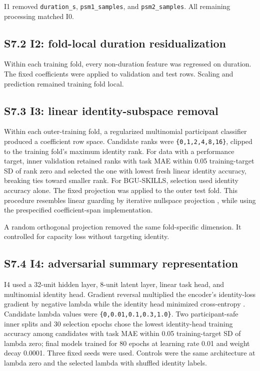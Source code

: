 \documentclass[11pt]{article}
\begin{document}
I1 removed \texttt{duration\_s}, \texttt{psm1\_samples}, and
\texttt{psm2\_samples}. All remaining processing matched I0.

\subsection{S7.2 I2: fold-local duration
residualization}\label{s7.2-i2-fold-local-duration-residualization}

Within each training fold, every non-duration feature was regressed on
duration. The fixed coefficients were applied to validation and test
rows. Scaling and prediction remained training fold local.

\subsection{S7.3 I3: linear identity-subspace
removal}\label{s7.3-i3-linear-identity-subspace-removal}

Within each outer-training fold, a regularized multinomial participant
classifier produced a coefficient row space. Candidate ranks were
\texttt{\{0,1,2,4,8,16\}}, clipped to the training fold's maximum
identity rank. For data with a performance target, inner validation
retained ranks with task MAE within 0.05 training-target SD of rank zero
and selected the one with lowest fresh linear identity accuracy,
breaking ties toward smaller rank. For BGU-SKILLS, selection used
identity accuracy alone. The fixed projection was applied to the outer
test fold. This procedure resembles linear guarding by iterative
nullspace projection \citep{Ravfogel2020}, while using the prespecified
coefficient-span implementation.

A random orthogonal projection removed the same fold-specific dimension.
It controlled for capacity loss without targeting identity.

\subsection{S7.4 I4: adversarial summary
representation}\label{s7.4-i4-adversarial-summary-representation}

I4 used a 32-unit hidden layer, 8-unit latent layer, linear task head,
and multinomial identity head. Gradient reversal multiplied the
encoder's identity-loss gradient by negative lambda while the identity
head minimized cross-entropy \citep{Ganin2016}. Candidate lambda values
were \texttt{\{0,0.01,0.1,0.3,1.0\}}. Two participant-safe inner splits
and 30 selection epochs chose the lowest identity-head training accuracy
among candidates with task MAE within 0.05 training-target SD of lambda
zero; final models trained for 80 epochs at learning rate 0.01 and
weight decay 0.0001. Three fixed seeds were used. Controls were the same
architecture at lambda zero and the selected lambda with shuffled
identity labels.
\end{document}

